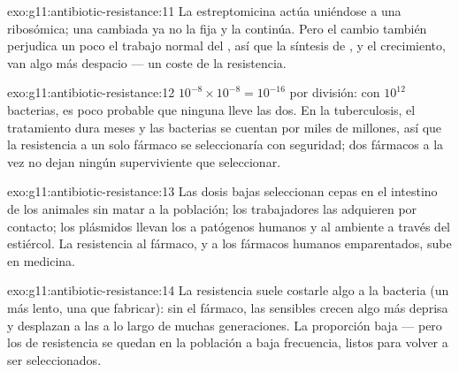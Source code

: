 \begin{solution}{exo:g11:antibiotic-resistance:11}
La estreptomicina actúa uniéndose a una  ribosómica; una
 cambiada ya no la fija y la  continúa. Pero el
cambio también perjudica un poco el trabajo normal del , así
que la síntesis de , y el crecimiento, van algo más despacio
--- un coste de la resistencia.
\end{solution}

\begin{solution}{exo:g11:antibiotic-resistance:12}
$10^{-8} \times 10^{-8} = 10^{-16}$ por división: con $10^{12}$
bacterias, es poco probable que ninguna  lleve las dos. En la
tuberculosis, el tratamiento dura meses y las bacterias se cuentan por
miles de millones, así que la resistencia a un solo fármaco se
seleccionaría con seguridad; dos fármacos a la vez no dejan ningún
superviviente que seleccionar.
\end{solution}

\begin{solution}{exo:g11:antibiotic-resistance:13}
Las dosis bajas seleccionan cepas  en el intestino de los
animales sin matar a la población; los trabajadores las adquieren por
contacto; los plásmidos llevan los  a patógenos humanos y al
ambiente a través del estiércol. La resistencia al fármaco, y a los
fármacos humanos emparentados, sube en medicina.
\end{solution}

\begin{solution}{exo:g11:antibiotic-resistance:14}
La resistencia suele costarle algo a la bacteria (un  más
lento, una  que fabricar): sin el fármaco, las  sensibles
crecen algo más deprisa y desplazan a las  a lo largo de
muchas generaciones. La proporción baja --- pero los  de
resistencia se quedan en la población a baja frecuencia, listos para
volver a ser seleccionados.
\end{solution}

